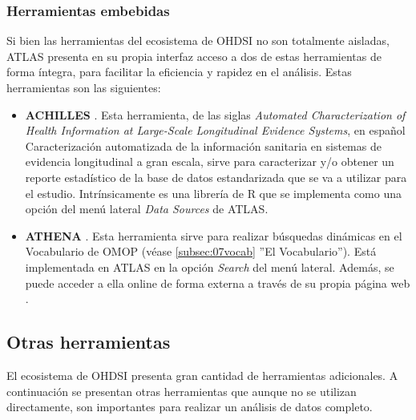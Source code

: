 \subsubsection{Herramientas embebidas}

Si bien las herramientas del ecosistema de OHDSI no son totalmente aisladas, ATLAS presenta en su propia interfaz acceso a dos de estas herramientas de forma íntegra, para facilitar la eficiencia y rapidez en el análisis. Estas herramientas son las siguientes:

\begin{itemize}

    \item \textbf{ACHILLES} \cite{githubACHILLES}. Esta herramienta, de las siglas \textit{Automated Characterization of Health Information at Large-Scale Longitudinal Evidence Systems}, en español Caracterización automatizada de la información sanitaria en sistemas de evidencia longitudinal a gran escala, sirve para caracterizar y/o obtener un reporte estadístico de la base de datos estandarizada que se va a utilizar para el estudio. Intrínsicamente es una librería de R que se implementa como una opción del menú lateral \textit{Data Sources} de ATLAS.
    \item \textbf{ATHENA} \cite{githubATHENA}. Esta herramienta sirve para realizar búsquedas dinámicas en el Vocabulario de OMOP (véase \ref{subsec:07vocab} ''El Vocabulario''). Está implementada en ATLAS en la opción \textit{Search} del menú lateral. Además, se puede acceder a ella online de forma externa a través de su propia página web \cite{ATHENAweb}.
    
\end{itemize}


\subsection{Otras herramientas} \label{subsec:07otrasHerramientas}

El ecosistema de OHDSI presenta gran cantidad de herramientas adicionales. A continuación se presentan otras herramientas que aunque no se utilizan directamente, son importantes para realizar un análisis de datos completo. 

